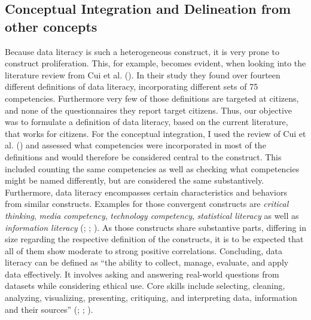 \documentclass[
  12pt,
  a4paper,
  twoside]{article}
\begin{document}
\subsection{Conceptual Integration and Delineation from other concepts}\label{conceptual-integration-and-delineation-from-other-concepts}

Because data literacy is such a heterogeneous construct, it is very prone to construct proliferation. This, for example, becomes evident, when looking into the literature review from Cui et al. (). In their study they found over fourteen different definitions of data literacy, incorporating different sets of 75 competencies. Furthermore very few of those definitions are targeted at citizens, and none of the questionnaires they report target citizens.
Thus, our objective was to formulate a definition of data literacy, based on the current literature, that works for citizens. For the conceptual integration, I used the review of Cui et al. () and assessed what competencies were incorporated in most of the definitions and would therefore be considered central to the construct. This included counting the same competencies as well as checking what competencies might be named differently, but are considered the same substantively. Furthermore, data literacy encompasses certain characteristics and behaviors from similar constructs. Examples for those convergent constructs are \emph{critical thinking}, \emph{media competency}, \emph{technology competency}, \emph{statistical literacy} as well as \emph{information literacy} (; ; ). As those constructs share substantive parts, differing in size regarding the respective definition of the constructs, it is to be expected that all of them show moderate to strong positive correlations.
Concluding, data literacy can be defined as ``the ability to collect, manage, evaluate, and apply data effectively. It involves asking and answering real-world questions from datasets while considering ethical use. Core skills include selecting, cleaning, analyzing, visualizing, presenting, critiquing, and interpreting data, information and their sources'' (; ; ).
\end{document}
